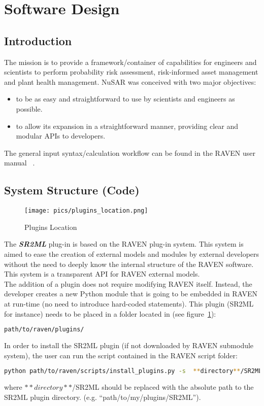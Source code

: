 \section{Software Design}
\subsection{Introduction}
The mission is to provide a framework/container of capabilities for
engineers and scientists to perform probability risk assessment,
risk-informed asset management and plant health management.
NuSAR was conceived with two major objectives:
\begin{itemize}
  \item  to be as easy and straightforward to use by scientists and engineers as possible.
  \item to allow its expansion in a straightforward manner, providing clear and modular APIs  to developers.
\end{itemize}
The general input syntax/calculation workflow can be found in the RAVEN user manual ~\cite{RAVENuserManual}.


\subsection{System Structure (Code)}
\begin{figure}
\centering
\texttt{[image: pics/plugins\_location.png]}
\caption{Plugins Location}
\label{fig:pluginsLocation}
\end{figure}

The  \textit{\textbf{SR2ML}} plug-in is based on the RAVEN plug-in system. This system is aimed to ease the creation
of external models and modules by external developers without the need to deeply know the internal structure
of the RAVEN software. This system is a transparent API for RAVEN external models.
\\The addition of a plugin does not require modifying RAVEN itself.
Instead, the developer creates a new Python module that is going to be embedded
 in RAVEN at run-time (no need to introduce  hard-coded statements).
 This plugin (SR2ML for instance) needs to be placed in a folder  located in (see figure~\ref{fig:pluginsLocation}):
\begin{lstlisting}[language=bash]
 path/to/raven/plugins/
\end{lstlisting}
In order to install the SR2ML plugin (if not downloaded by RAVEN submodule system),
 the user can run the script contained in the RAVEN script folder:
\begin{lstlisting}[language=bash]
 python path/to/raven/scripts/install_plugins.py -s  **directory**/SR2ML
\end{lstlisting}
where  $**directory**$/SR2ML should be replaced with the absolute path to the SR2ML plugin directory.
(e.g. ``path/to/my/plugins/SR2ML'').

